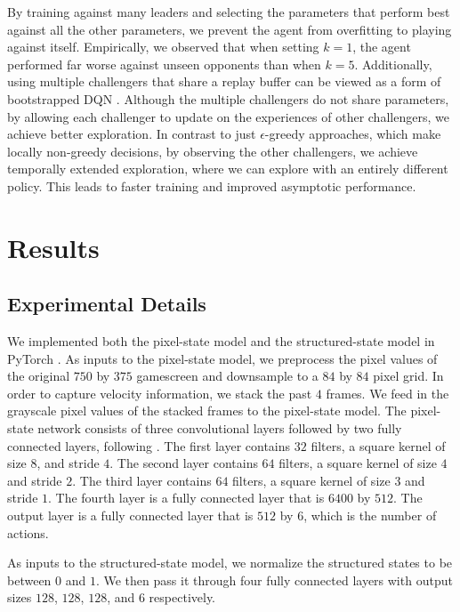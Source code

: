 \documentclass[10pt,twocolumn,letterpaper]{article}
\begin{document}
By training against many leaders and selecting the parameters that perform
best against all the other parameters, we prevent the agent from overfitting
to playing against itself. Empirically, we observed that when setting $k = 1$,
the agent performed far worse against unseen opponents than when $k = 5$.
Additionally, using multiple challengers that share a replay buffer can be
viewed as a form of bootstrapped DQN \citep{osband2016deep}. Although the
multiple challengers do not share parameters, by allowing each challenger to
update on the experiences of other challengers, we achieve better exploration.
In contrast to just $\epsilon$-greedy approaches, which make locally
non-greedy decisions, by observing the other challengers, we achieve
temporally extended exploration, where we can explore with an entirely
different policy. This leads to faster training and improved asymptotic
performance.

\section{Results}

\subsection{Experimental Details}
We implemented both the pixel-state model and the structured-state model in
PyTorch \citep{paszke2017automatic}. As inputs to the pixel-state model, we
preprocess the pixel values of the original $750$ by $375$ gamescreen and
downsample to a $84$ by $84$ pixel grid. In order to capture velocity
information, we stack the past $4$ frames. We feed in the grayscale pixel
values of the stacked frames to the pixel-state model. The pixel-state network
consists of three convolutional layers followed by two fully connected layers,
following \citep{nature2013}. The first layer contains $32$ filters, a square kernel
of size $8$, and stride $4$. The second layer contains $64$ filters, a square
kernel of size $4$ and stride $2$. The third layer contains $64$ filters, a
square kernel of size $3$ and stride $1$. The fourth layer is a fully
connected layer that is $6400$ by $512$. The output layer is a fully connected
layer that is $512$ by $6$, which is the number of actions.

As inputs to the structured-state model, we normalize the structured states to
be between $0$ and $1$. We then pass it through four fully connected layers
with output sizes $128$, $128$, $128$, and $6$ respectively.
\end{document}
